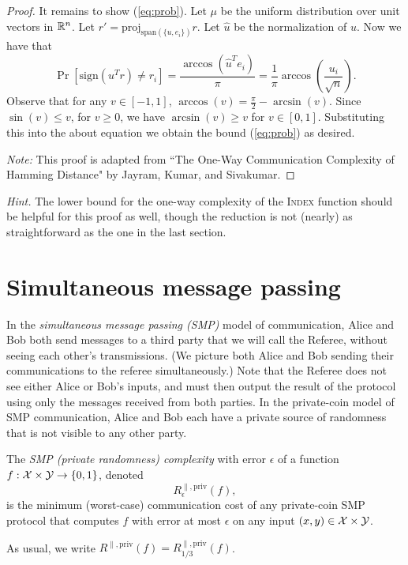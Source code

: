 \begin{proof}
It remains to show (\ref{eq:prob}). Let $\mu$ be the uniform distribution over unit vectors in $\mathbb{R}^n$. Let $r' = \text{proj}_{\text{span}(\{u,e_i\})}r.$
Let $\hat{u}$ be the normalization of $u$. Now we have that
$$\Pr[\text{sign}(u^Tr)\neq r_i] = \frac{\arccos(\hat{u}^Te_i)}{\pi} = \frac{1}{\pi}\arccos(\frac{u_i}{\sqrt{n}}).$$
Observe that for any $v \in [-1,1]$, $\arccos(v) = \frac{\pi}{2} - \arcsin(v)$. Since $\sin(v) \leq v$, for $v\geq 0$, we have $\arcsin(v) \geq v$ for $v \in [0,1]$. Substituting this into the about equation we obtain the bound (\ref{eq:prob}) as desired.

\emph{Note:} This proof is adapted from ``The One-Way Communication Complexity of Hamming Distance" by Jayram, Kumar, and Sivakumar.
\end{proof}

\bigskip
\emph{Hint.} The lower bound for the one-way complexity of the \textsc{Index} function should be helpful for this proof as well, though the reduction is not (nearly) as straightforward as the one in the last section.


\newpage 
\section{Simultaneous message passing}

In the \emph{simultaneous message passing (SMP)} model of communication, Alice and Bob both send messages to a third party that we will call the Referee, without seeing each other's transmissions. (We picture both Alice and Bob sending their communications to the referee simultaneously.) Note that the Referee does not see either Alice or Bob's inputs, and must then output the result of the protocol using only the messages received from both parties. In the private-coin model of SMP communication, Alice and Bob each have a private source of randomness that is not visible to any other party.

\begin{definition}
The \emph{SMP (private randomness) complexity} with error $\epsilon$ of a function $f : \mathcal{X} \times \mathcal{Y} \to \{0,1\}$, denoted
\[
R^{\parallel,\mathrm{priv}}_\epsilon(f),
\] 
is the minimum (worst-case) communication cost of any private-coin SMP protocol that computes $f$ with error at most $\epsilon$ on any input $(x,y) \in \mathcal{X} \times \mathcal{Y}$.
\end{definition}

As usual, we write $R^{\parallel,\mathrm{priv}}(f) = R^{\parallel,\mathrm{priv}}_{1/3}(f)$.

